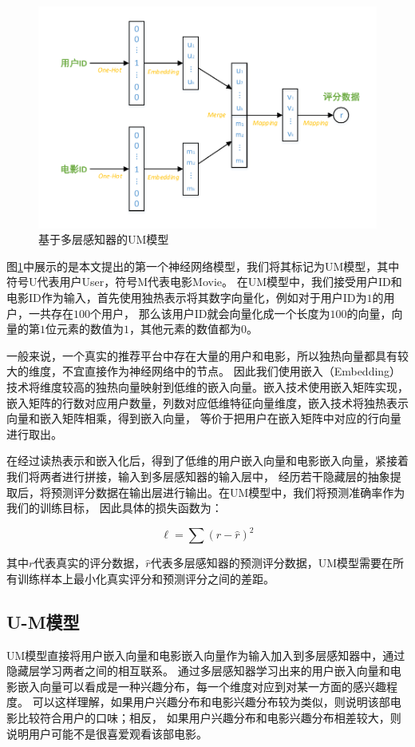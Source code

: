 \begin{figure}[htbp]
\centering
\includegraphics[scale=0.7]{images/a_b.pdf}
\caption{基于多层感知器的UM模型}
\label{fig:a_b}
\end{figure}

图\ref{fig:a_b}中展示的是本文提出的第一个神经网络模型，我们将其标记为UM模型，其中符号U代表用户User，符号M代表电影Movie。
在UM模型中，我们接受用户ID和电影ID作为输入，首先使用独热表示将其数字向量化，例如对于用户ID为$1$的用户，一共存在$100$个用户，
那么该用户ID就会向量化成一个长度为$100$的向量，向量的第$1$位元素的数值为$1$，其他元素的数值都为$0$。

一般来说，一个真实的推荐平台中存在大量的用户和电影，所以独热向量都具有较大的维度，不宜直接作为神经网络中的节点。
因此我们使用嵌入（Embedding）技术将维度较高的独热向量映射到低维的嵌入向量。嵌入技术使用嵌入矩阵实现，
嵌入矩阵的行数对应用户数量，列数对应低维特征向量维度，嵌入技术将独热表示向量和嵌入矩阵相乘，得到嵌入向量，
等价于把用户在嵌入矩阵中对应的行向量进行取出。

在经过读热表示和嵌入化后，得到了低维的用户嵌入向量和电影嵌入向量，紧接着我们将两者进行拼接，输入到多层感知器的输入层中，
经历若干隐藏层的抽象提取后，将预测评分数据在输出层进行输出。在UM模型中，我们将预测准确率作为我们的训练目标，
因此具体的损失函数为：

\begin{equation}
\ell = \sum{ (r - \hat{r})^2 }
\end{equation}

其中$r$代表真实的评分数据，$\hat{r}$代表多层感知器的预测评分数据，UM模型需要在所有训练样本上最小化真实评分和预测评分之间的差距。

\subsection{U-M模型}
UM模型直接将用户嵌入向量和电影嵌入向量作为输入加入到多层感知器中，通过隐藏层学习两者之间的相互联系。
通过多层感知器学习出来的用户嵌入向量和电影嵌入向量可以看成是一种兴趣分布，每一个维度对应到对某一方面的感兴趣程度。
可以这样理解，如果用户兴趣分布和电影兴趣分布较为类似，则说明该部电影比较符合用户的口味；相反，
如果用户兴趣分布和电影兴趣分布相差较大，则说明用户可能不是很喜爱观看该部电影。


